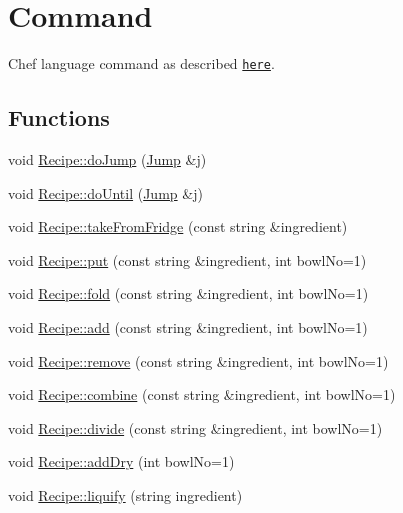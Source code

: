 \hypertarget{group__Command}{\section{Command}
\label{group__Command}
}


Chef language command as described \href{http://www.dangermouse.net/esoteric/chef.html}{\tt here}.  


\subsection*{Functions}
\begin{DoxyCompactItemize}
\item 
void \hyperlink{group__Command_ga003607cfe3ab13de0bc6b85d659856bc}{Recipe\-::do\-Jump} (\hyperlink{structJump}{Jump} \&j)
\item 
void \hyperlink{group__Command_gadad4684f1b60dbabd7ac9b8ac9816d32}{Recipe\-::do\-Until} (\hyperlink{structJump}{Jump} \&j)
\item 
void \hyperlink{group__Command_ga5119039470b26422e6ec843515d4a720}{Recipe\-::take\-From\-Fridge} (const string \&ingredient)
\item 
void \hyperlink{group__Command_ga928df02758f8f959f4beeb153ddde7d6}{Recipe\-::put} (const string \&ingredient, int bowl\-No=1)
\item 
void \hyperlink{group__Command_gaf5f825d69a4a19837a0714715710734a}{Recipe\-::fold} (const string \&ingredient, int bowl\-No=1)
\item 
void \hyperlink{group__Command_ga385cb79270fb9c857256ef79ff65010e}{Recipe\-::add} (const string \&ingredient, int bowl\-No=1)
\item 
void \hyperlink{group__Command_ga31fa0f785049498f85ab6e299217c7ab}{Recipe\-::remove} (const string \&ingredient, int bowl\-No=1)
\item 
void \hyperlink{group__Command_ga276a0e85ac154372bf1c4cdaf7304d09}{Recipe\-::combine} (const string \&ingredient, int bowl\-No=1)
\item 
void \hyperlink{group__Command_ga5d32e4fe23897d4dbb0b10eb4821baeb}{Recipe\-::divide} (const string \&ingredient, int bowl\-No=1)
\item 
void \hyperlink{group__Command_ga7c657ea9ec19dfb55292a7474fe12511}{Recipe\-::add\-Dry} (int bowl\-No=1)
\item 
void \hyperlink{group__Command_gadf633f6ac72e47c575d128c5c6a32615}{Recipe\-::liquify} (string ingredient)
\item 

\end{DoxyCompactItemize}
